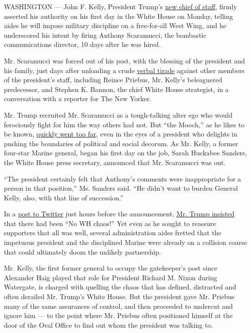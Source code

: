 WASHINGTON --- John F. Kelly, President Trump's
\href{https://www.nytimes.com/2017/07/28/us/politics/john-kelly-chief-of-staff-donald-trump.html}{new
chief of staff}, firmly asserted his authority on his first day in the
White House on Monday, telling aides he will impose military discipline
on a free-for-all West Wing, and he underscored his intent by firing
Anthony Scaramucci, the bombastic communications director, 10 days after
he was hired.

Mr. Scaramucci was forced out of his post, with the blessing of the
president and his family, just days after unloading a crude
\href{https://www.nytimes.com/2017/07/27/us/politics/scaramucci-priebus-leaks.html}{verbal
tirade} against other members of the president's staff, including Reince
Priebus, Mr. Kelly's beleaguered predecessor, and Stephen K. Bannon, the
chief White House strategist, in a conversation with a reporter for The
New Yorker.

Mr. Trump recruited Mr. Scaramucci as a tough-talking alter ego who
would ferociously fight for him the way others had not. But ``the
Mooch,'' as he likes to be known,
\href{http://www.newyorker.com/news/ryan-lizza/anthony-scaramucci-called-me-to-unload-about-white-house-leakers-reince-priebus-and-steve-bannon}{quickly
went too far}, even in the eyes of a president who delights in pushing
the boundaries of political and social decorum. As Mr. Kelly, a former
four-star Marine general, began his first day on the job, Sarah Huckabee
Sanders, the White House press secretary, announced that Mr. Scaramucci
was out.

``The president certainly felt that Anthony's comments were
inappropriate for a person in that position,'' Ms. Sanders said. ``He
didn't want to burden General Kelly, also, with that line of
succession.''

In a
\href{https://twitter.com/realDonaldTrump/status/891998881009061888}{post
to Twitter} just hours before the announcement,
\href{https://www.nytimes.com/2017/07/31/us/politics/trump-white-house-obamacare-health.html}{Mr.
Trump insisted} that there had been ``No WH chaos!'' Yet even as he
sought to reassure supporters that all was well, several administration
aides fretted that the impetuous president and the disciplined Marine
were already on a collision course that could ultimately doom the
unlikely partnership.

Mr. Kelly, the first former general to occupy the gatekeeper's post
since Alexander Haig played that role for President Richard M. Nixon
during Watergate, is charged with quelling the chaos that has defined,
distracted and often derailed Mr. Trump's White House. But the president
gave Mr. Priebus many of the same assurances of control, and then
proceeded to undercut and ignore him --- to the point where Mr. Priebus
often positioned himself at the door of the Oval Office to find out whom
the president was talking to.

